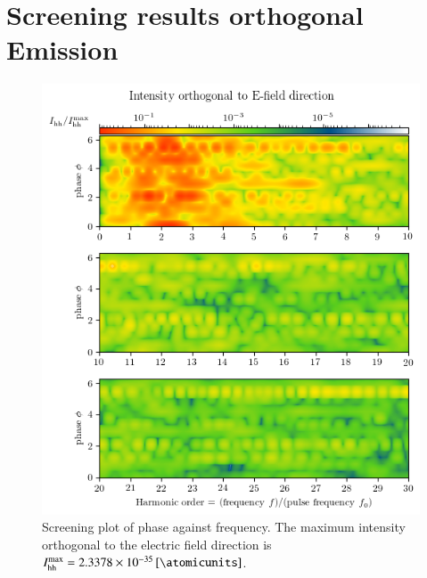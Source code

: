 \documentclass[11pt, a4paper]{scrartcl}
\begin{document}
\section{Screening results orthogonal Emission}
\begin{figure}[H]
    \centering
    \includegraphics[width=\textwidth]{phase=variable_ortho_plot.png}
    \caption{Screening plot of phase against frequency. The maximum intensity orthogonal
      to the electric field direction is $I_{\mathrm{hh}}^{\mathrm{max}} = \SI{2.3378e-35}{[\atomicunits]}$.}
    \label{fig:sec1_orthogonal_screening}
\end{figure}
\end{document}
